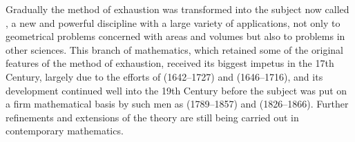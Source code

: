 \begin{note}
  Gradually the method of exhaustion was transformed into the subject now called , a new and powerful discipline with a large variety of applications, not only to geometrical problems concerned with areas and volumes but also to problems in other sciences.
  This branch of mathematics, which retained some of the original features of the method of exhaustion, received its biggest impetus in the 17th Century, largely due to the efforts of  (1642--1727) and  (1646--1716), and its development continued well into the 19th Century before the subject was put on a firm mathematical basis by such men as  (1789--1857) and  (1826--1866).
  Further refinements and extensions of the theory are still being carried out in contemporary mathematics.
\end{note}
